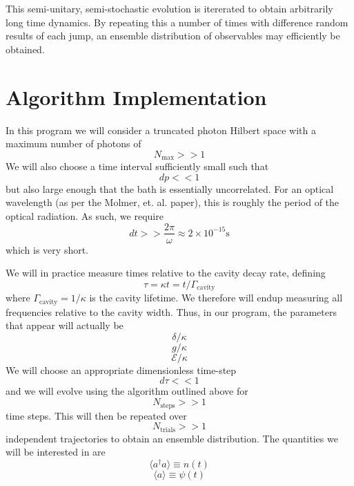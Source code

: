 \documentclass[11pt, oneside]{article}
\begin{document}
This semi-unitary, semi-stochastic evolution is itererated to obtain arbitrarily long time dynamics. By repeating this a number of times with difference random results of each jump, an ensemble distribution of observables may efficiently be obtained. 

\section{Algorithm Implementation}
In this program we will consider a truncated photon Hilbert space with a maximum number of photons of 
\[
N_{\textrm{max}} >>1
\]
We will also choose a time interval sufficiently small such that 
\[
dp << 1
\]
but also large enough that the bath is essentially uncorrelated. For an optical wavelength (as per the Molmer, et. al. paper), this is roughly the period of the optical radiation. As such, we require 
\[
dt >> \frac{2\pi}{\omega} \approx 2\times 10^{-15} \si{\s}
\]
which is very short.  

We will in practice measure times relative to the cavity decay rate, defining 
\[
\tau = \kappa t = t/\Gamma_{\textrm{cavity}}
\]
where $\Gamma_{\textrm{cavity}} = 1/\kappa$ is the cavity lifetime. We therefore will endup measuring all frequencies relative to the cavity width. Thus, in our program, the parameters that appear will actually be 
\[
\delta/\kappa
\]
\[
g/\kappa
\]
\[
\mathcal{E}/\kappa
\]
We will choose an appropriate dimensionless time-step 
\[
d\tau <<1
\]
and we will evolve using the algorithm outlined above for 
\[
N_{\textrm{steps}} >>1 
\]
time steps. This will then be repeated over 
\[
N_{\textrm{trials}} >>1 
\]
independent trajectories to obtain an ensemble distribution. The quantities we will be interested in are 
\[
\langle a^\dagger a \rangle \equiv n(t)
\]
\[
 \langle a \rangle \equiv \psi(t)
\]

 
\end{document}
